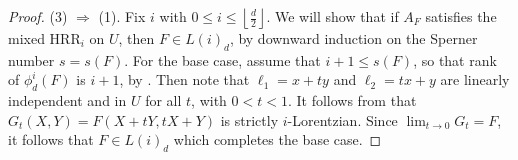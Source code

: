 \documentclass[unnumsec,webpdf,modern,medium]{oup-authoring-template}
\newcommand{\R}{\mathbb{R}}
\newcommand{\N}{\mathbb{N}}
\newcommand{\flo}[1]{\left\lfloor\frac{#1}{2}\right\rfloor}
\theoremstyle{theorem}
\theoremstyle{definition}
\begin{document}
\begin{proof}
	
	(3) $\Rightarrow$ (1).  Fix $i$ with $0\leq i\leq \flo{d}$.  We will show that if $A_F$ satisfies the mixed HRR$_i$ on $U$, then  $F\in L(i)_d$, by downward induction on the Sperner number $s=s(F)$.  For the base case, assume that  $i+1\leq s(F)$, so that rank of $\phi^i_d(F)$ is $i+1$, by \cite[Lemma 4.5]{MMS}.  Then note that $\ell_1=x+ty$ and $\ell_2=tx+y$ are linearly independent and in $U$ for all $t$, with $0<t<1$.  It follows from \cite[Corollary 4.13]{MMS} that $G_t(X,Y)=F(X+tY,tX+Y)$ is strictly $i$-Lorentzian.  Since $\lim_{t\to 0}G_t=F$, it follows that $F\in L(i)_d$ which completes the base case.
	

\end{proof}
\end{document}
